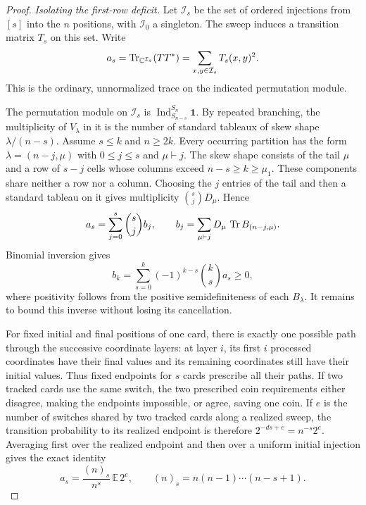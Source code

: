\begin{proof}
\emph{Isolating the first-row deficit.}
Let $\mathcal I_s$ be the set of ordered injections from $[s]$ into
the $n$ positions, with $\mathcal I_0$ a singleton. The sweep induces
a transition matrix $T_s$ on this set. Write
\[
 a_s=\operatorname{Tr}_{\mathbb C^{\mathcal I_s}}(TT^*)
     =\sum_{x,y\in\mathcal I_s}T_s(x,y)^2.
\]
This is the ordinary, unnormalized trace on the indicated permutation module.

The permutation module on $\mathcal I_s$ is
$\operatorname{Ind}_{S_{n-s}}^{S_n}\mathbf1$. By repeated branching,
the multiplicity of $V_\lambda$ in it is the number of standard
tableaux of skew shape $\lambda/(n-s)$. Assume $s\le k$ and
$n\ge2k$. Every occurring partition has the form
$\lambda=(n-j,\mu)$ with $0\le j\le s$ and $\mu\vdash j$.
The skew shape consists of the tail $\mu$ and a row of $s-j$ cells
whose columns exceed $n-s\ge k\ge\mu_1$. These components share
neither a row nor a column. Choosing the $j$ entries of the tail and
then a standard tableau on it gives multiplicity
$\binom{s}{j}D_\mu$. Hence
\[
 a_s=\sum_{j=0}^s\binom{s}{j}b_j,
 \qquad
 b_j=\sum_{\mu\vdash j}D_\mu\,
                \operatorname{Tr} B_{(n-j,\mu)}.
\]
Binomial inversion gives
\begin{equation}
\label{eq:sparse-inverse}
 b_k=\sum_{s=0}^k(-1)^{k-s}\binom{k}{s}a_s\ge0,
\end{equation}
where positivity follows from the positive semidefiniteness of each
$B_\lambda$. It remains to bound this inverse without losing its
cancellation.

For fixed initial and final positions of one card, there is exactly
one possible path through the successive coordinate layers: at layer
$i$, its first $i$ processed coordinates have their final values and
its remaining coordinates still have their initial values. Thus fixed
endpoints for $s$ cards prescribe all their paths. If two tracked cards
use the same switch, the two prescribed coin requirements either
disagree, making the endpoints impossible, or agree, saving one coin.
If $e$ is the number of switches shared by two tracked cards along a
realized sweep, the transition probability to its realized endpoint is
therefore $2^{-ds+e}=n^{-s}2^e$. Averaging first over the realized
endpoint and then over a uniform initial injection gives the exact
identity
\begin{equation}
\label{eq:sparse-trace}
 a_s=\frac{(n)_s}{n^s}\,\mathbb E\,2^e,
 \qquad (n)_s=n(n-1)\cdots(n-s+1).
\end{equation}


\end{proof}
